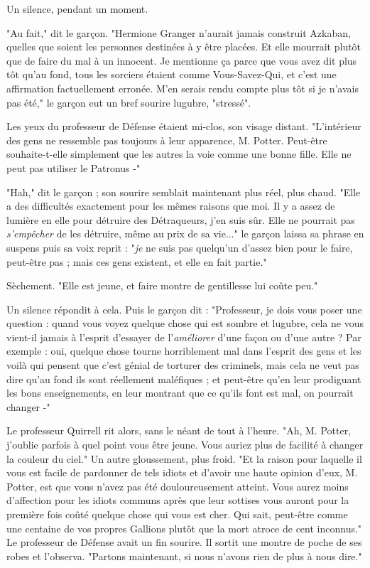 Un silence, pendant un moment.

"Au fait," dit le garçon. "Hermione Granger n'aurait jamais construit Azkaban, quelles que soient les personnes destinées à y être placées. Et elle mourrait plutôt que de faire du mal à un innocent. Je mentionne ça parce que vous avez dit plus tôt qu'au fond, tous les sorciers étaient comme Vous-Savez-Qui, et c'est une affirmation factuellement erronée. M'en serais rendu compte plus tôt si je n'avais pas été," le garçon eut un bref sourire lugubre, "stressé".

Les yeux du professeur de Défense étaient mi-clos, son visage distant. "L'intérieur des gens ne ressemble pas toujours à leur apparence, M. Potter. Peut-être souhaite-t-elle simplement que les autres la voie comme une bonne fille. Elle ne peut pas utiliser le Patronus -"

"Hah," dit le garçon ; son sourire semblait maintenant plus réel, plus chaud. "Elle a des difficultés exactement pour les mêmes raisons que moi. Il y a assez de lumière en elle pour détruire des Détraqueurs, j'en suis sûr. Elle ne pourrait pas \emph{s'empêcher}  de les détruire, même au prix de sa vie..." le garçon laissa sa phrase en suspens puis sa voix reprit : "\emph{je}  ne suis pas quelqu'un d'assez bien pour le faire, peut-être pas ; mais ces gens existent, et elle en fait partie."

Sèchement. "Elle est jeune, et faire montre de gentillesse lui coûte peu."

Un silence répondit à cela. Puis le garçon dit : "Professeur, je dois vous poser une question : quand vous voyez quelque chose qui est sombre et lugubre, cela ne vous vient-il jamais à l'esprit d'essayer de l'\emph{améliorer}  d'une façon ou d'une autre ? Par exemple : oui, quelque chose tourne horriblement mal dans l'esprit des gens et les voilà qui pensent que c'est génial de torturer des criminels, mais cela ne veut pas dire qu'au fond ils sont réellement maléfiques ; et peut-être qu'en leur prodiguant les bons enseignements, en leur montrant que ce qu'ils font est mal, on pourrait changer -"

Le professeur Quirrell rit alors, sans le néant de tout à l'heure. "Ah, M. Potter, j'oublie parfois à quel point vous être jeune. Vous auriez plus de facilité à changer la couleur du ciel." Un autre gloussement, plus froid. "Et la raison pour laquelle il vous est facile de pardonner de tels idiots et d'avoir une haute opinion d'eux, M. Potter, est que vous n'avez pas été douloureusement atteint. Vous aurez moins d'affection pour les idiots communs après que leur sottises vous auront pour la première fois coûté quelque chose qui vous est cher. Qui sait, peut-être comme une centaine de vos propres Gallions plutôt que la mort atroce de cent inconnus." Le professeur de Défense avait un fin sourire. Il sortit une montre de poche de ses robes et l'observa. "Partons maintenant, si nous n'avons rien de plus à nous dire."

